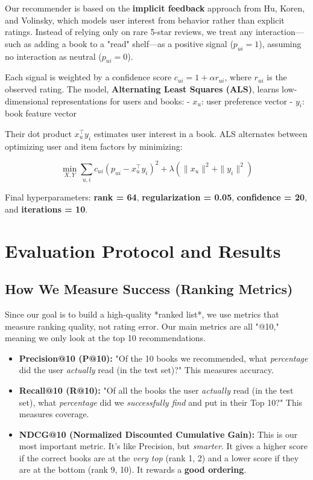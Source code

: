 \documentclass[11pt,a4paper]{article}
\newcommand{\RankParam}{64}
\newcommand{\RegParam}{0.05}
\newcommand{\AlphaParam}{20}
\newcommand{\ItersParam}{10}
\begin{document}
Our recommender is based on the \textbf{implicit feedback} approach from Hu, Koren, and Volinsky, which models user interest from behavior rather than explicit ratings. Instead of relying only on rare 5-star reviews, we treat any interaction—such as adding a book to a "read" shelf—as a positive signal ($p_{ui}=1$), assuming no interaction as neutral ($p_{ui}=0$).  

Each signal is weighted by a confidence score $c_{ui}=1+\alpha r_{ui}$, where $r_{ui}$ is the observed rating. The model, \textbf{Alternating Least Squares (ALS)}, learns low-dimensional representations for users and books:
- $x_u$: user preference vector  
- $y_i$: book feature vector  

Their dot product $x_u^\top y_i$ estimates user interest in a book. ALS alternates between optimizing user and item factors by minimizing:

$$
\min_{X,Y} \sum_{u,i} c_{ui}(p_{ui} - x_u^\top y_i)^2 + \lambda(\|x_u\|^2 + \|y_i\|^2)
$$

Final hyperparameters: \textbf{rank = \RankParam}, \textbf{regularization = \RegParam}, \textbf{confidence = \AlphaParam}, and \textbf{iterations = \ItersParam}.  

\section{Evaluation Protocol and Results}\label{sec:results}
\subsection*{How We Measure Success (Ranking Metrics)}
Since our goal is to build a high-quality *ranked list*, we use metrics that measure ranking quality, not rating error. Our main metrics are all "@10," meaning we only look at the top 10 recommendations.

\begin{itemize}
    \item \textbf{Precision@10 (P@10):} "Of the 10 books we recommended, what \emph{percentage} did the user \emph{actually} read (in the test set)?" This measures accuracy.
    \item \textbf{Recall@10 (R@10):} "Of all the books the user \emph{actually} read (in the test set), what \emph{percentage} did we \emph{successfully find} and put in their Top 10?" This measures coverage.
    \item \textbf{NDCG@10 (Normalized Discounted Cumulative Gain):} This is our most important metric. It's like Precision, but \emph{smarter}. It gives a higher score if the correct books are at the \emph{very top} (rank 1, 2) and a lower score if they are at the bottom (rank 9, 10). It rewards a \textbf{good ordering}.
\end{itemize}
\end{document}

